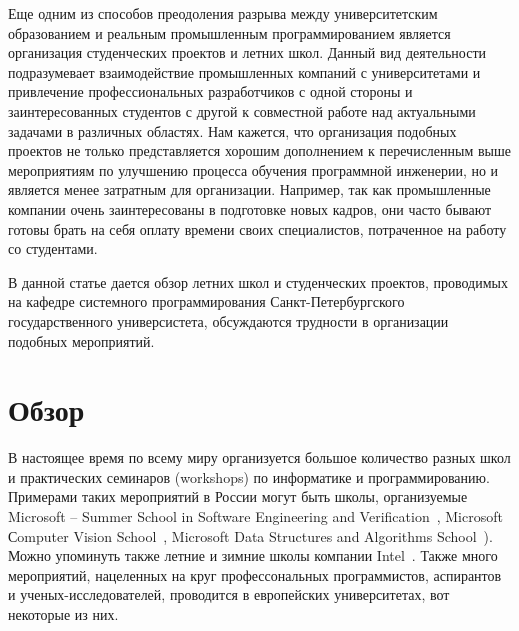 \documentclass[a5paper]{article}
\begin{document}
Еще одним из способов преодоления разрыва между университетским образованием и реальным промышленным программированием является организация студенческих проектов и летних школ. Данный вид деятельности подразумевает взаимодействие промышленных компаний с университетами и привлечение профессиональных разработчиков с одной стороны и заинтересованных студентов с другой к совместной работе над актуальными задачами в различных областях. Нам кажется, что организация подобных проектов не только представляется хорошим дополнением к перечисленным выше мероприятиям по улучшению процесса обучения программной инженерии, но и является менее затратным для организации. Например, так как промышленные компании очень заинтересованы в подготовке новых кадров, они часто бывают готовы брать на себя оплату времени своих специалистов, потраченное на работу со студентами. 
 
В данной статье дается обзор летних школ и студенческих проектов, проводимых на кафедре системного программирования Санкт-Петербургского государственного универсистета, обсуждаются трудности в организации подобных мероприятий.

\section{Обзор}

В настоящее время по всему миру организуется большое количество разных школ и практических семинаров (workshops) по информатике и программированию. Примерами таких мероприятий в России могут быть школы, организуемые Microsoft –  Summer School in Software Engineering and Verification~\cite{ms1}, Microsoft Сomputer Vision School~\cite{ms2}, Microsoft Data Structures and Algorithms School~\cite{ms3}). Можно упоминуть также  летние и зимние школы компании Intel~\cite{intel1, intel2, intel3}. Также много мероприятий, нацеленных на круг профессональных программистов,  аспирантов и ученых-исследователей, проводится в европейских университетах, вот некоторые из них. 
\end{document}
